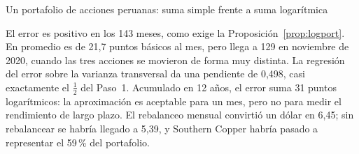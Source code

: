 \begin{ejresuelto}{Un portafolio de acciones peruanas: suma simple frente a suma logarítmica}
\begin{conclusion}
El error es positivo en los 143 meses, como exige la Proposición~\ref{prop:logport}. En promedio es de
21,7 puntos básicos al mes, pero llega a 129 en noviembre de 2020, cuando las tres acciones se movieron de
forma muy distinta. La regresión del error sobre la varianza transversal da una pendiente de 0,498,
casi exactamente el $\tfrac12$ del Paso~1. Acumulado en 12 años, el error suma 31 puntos logarítmicos:
la aproximación es aceptable para un mes, pero no para medir el rendimiento de largo plazo. El rebalanceo
mensual convirtió un dólar en 6,45; sin rebalancear se habría llegado a 5,39, y Southern Copper habría
pasado a representar el 59\,\% del portafolio.
\end{conclusion}
\end{ejresuelto}

